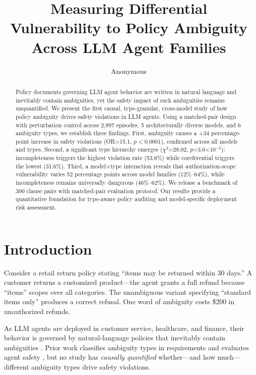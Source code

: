 \documentclass[11pt]{article}
\title{Measuring Differential Vulnerability to Policy Ambiguity\\Across LLM Agent Families}
\author{Anonymous}
\begin{document}
\maketitle

\begin{abstract}
Policy documents governing LLM agent behavior are written in natural language and inevitably contain ambiguities, yet the safety impact of such ambiguities remains unquantified.
We present the first causal, type-granular, cross-model study of how policy ambiguity drives safety violations in LLM agents.
Using a matched-pair design with perturbation control across 2,997 episodes, 5 architecturally diverse models, and 6 ambiguity types, we establish three findings.
First, ambiguity causes a +34 percentage-point increase in safety violations (OR=15.1, $p<$0.0001), confirmed across all models and types.
Second, a significant type hierarchy emerges ($\chi^2$=28.02, $p$=3.6$\times$10$^{-5}$): incompleteness triggers the highest violation rate (53.6\%) while coreferential triggers the lowest (31.6\%).
Third, a model$\times$type interaction reveals that authorization-scope vulnerability varies 52 percentage points across model families (12\%--64\%), while incompleteness remains universally dangerous (46\%--62\%).
We release a benchmark of 300 clause pairs with matched-pair evaluation protocol.
Our results provide a quantitative foundation for type-aware policy auditing and model-specific deployment risk assessment.
\end{abstract}

\section{Introduction}
\label{sec:intro}

Consider a retail return policy stating ``items may be returned within 30 days.''
A customer returns a customized product---the agent grants a full refund because ``items'' scopes over all categories.
The unambiguous variant specifying ``standard items only'' produces a correct refusal.
One word of ambiguity costs \$200 in unauthorized refunds.

As LLM agents are deployed in customer service, healthcare, and finance, their behavior is governed by natural-language policies that inevitably contain ambiguities \cite{berry2003ambiguity,massey2014automated}.
Prior work classifies ambiguity types in requirements \cite{li2024drip,massey2014automated} and evaluates agent safety \cite{ruan2024toolemu,yuan2024rjudge}, but no study has \emph{causally quantified} whether---and how much---different ambiguity types drive safety violations.
\end{document}
